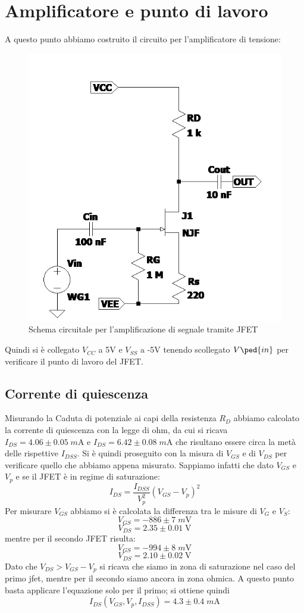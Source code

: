 \documentclass[10pt, a4paper, italian]{article}
\begin{document}
\section{Amplificatore e punto di lavoro}
A questo punto abbiamo costruito il circuito per l'amplificatore di tensione:
\begin{figure}[htbp]
    \centering
	\includegraphics[scale=0.7]{Draft2}
    \caption{Schema circuitale per l'amplificazione di segnale tramite JFET}
\end{figure}
Quindi si è collegato $V_{CC}$ a 5V e $V_{SS}$ a -5V tenendo scollegato $V\ped{in}$ per verificare il punto di lavoro del JFET.
\subsection{Corrente di quiescenza}
Misurando la Caduta di potenziale ai capi della resistenza $R_D$ abbiamo calcolato la corrente di quiescenza con la legge di ohm, da cui si ricava $I_{DS}=4.06 \pm 0.05 \; \si{m\A}$ e $I_{DS}=6.42 \pm 0.08 \; \si{m\A}$ che risultano essere circa la metà delle rispettive $I_{DSS}$.
Si è quindi proseguito con la misura di $V_{GS}$ e di $V_{DS}$ per verificare quello che abbiamo appena misurato.
Sappiamo infatti che dato $V_{GS}$ e $V_p$ e se il JFET è in regime di saturazione:
\begin{equation}
I_{DS}=\frac{I_{DSS}}{V_p ^2}(V_{GS}-V_p)^2
\end{equation}
Per misurare $V_{GS}$ abbiamo si è calcolata la differenza tra le misure di $V_G$ e $V_S$:
\[
V_{GS}=-886 \pm 7 \; \si{m\V}
\]
\[
V_{DS}=2.35 \pm 0.01 \; \si{\V}
\]
mentre per il secondo JFET risulta:
\[
V_{GS}=-994 \pm 8 \; \si{m\V}
\]
\[
V_{DS}=2.10 \pm 0.02 \; \si{\V}
\]
Dato che $V_{DS} > V_{GS} - V_p$ si ricava che siamo in zona di saturazione nel caso del primo jfet, mentre per il secondo siamo ancora in zona ohmica. A questo punto basta applicare l'equazione solo per il primo; si ottiene quindi 
\[
I_{DS}(V_{GS},V_p,I_{DSS})=4.3\pm 0.4 \; \si{m\A}
\]
\end{document}
